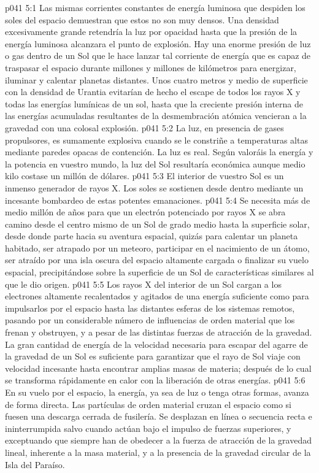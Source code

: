 \vs p041 5:1 Las mismas corrientes constantes de energía luminosa que despiden los soles del espacio demuestran que estos no son muy densos. Una densidad excesivamente grande retendría la luz por opacidad hasta que la presión de la energía luminosa alcanzara el punto de explosión. Hay una enorme presión de luz o gas dentro de un Sol que le hace lanzar tal corriente de energía que es capaz de traspasar el espacio durante millones y millones de kilómetros para energizar, iluminar y calentar planetas distantes. Unos cuatro metros y medio de superficie con la densidad de Urantia evitarían de hecho el escape de todos los rayos X y todas las energías lumínicas de un sol, hasta que la creciente presión interna de las energías acumuladas resultantes de la desmembración atómica vencieran a la gravedad con una colosal explosión.
\vs p041 5:2 La luz, en presencia de gases propulsores, es sumamente explosiva cuando se le constriñe a temperaturas altas mediante paredes opacas de contención. La luz es real. Según valoráis la energía y la potencia en vuestro mundo, la luz del Sol resultaría económica aunque medio kilo costase un millón de dólares.
\vs p041 5:3 El interior de vuestro Sol es un inmenso generador de rayos X. Los soles se sostienen desde dentro mediante un incesante bombardeo de estas potentes emanaciones.
\vs p041 5:4 Se necesita más de medio millón de años para que un electrón potenciado por rayos X se abra camino desde el centro mismo de un Sol de grado medio hasta la superficie solar, desde donde parte hacia su aventura espacial, quizás para calentar un planeta habitado, ser atrapado por un meteoro, participar en el nacimiento de un átomo, ser atraído por una isla oscura del espacio altamente cargada o finalizar su vuelo espacial, precipitándose sobre la superficie de un Sol de características similares al que le dio origen.
\vs p041 5:5 Los rayos X del interior de un Sol cargan a los electrones altamente recalentados y agitados de una energía suficiente como para impulsarlos por el espacio hasta las distantes esferas de los sistemas remotos, pasando por un considerable número de influencias de orden material que los frenan y obstruyen, y a pesar de las distintas fuerzas de atracción de la gravedad. La gran cantidad de energía de la velocidad necesaria para escapar del agarre de la gravedad de un Sol es suficiente para garantizar que el rayo de Sol viaje con velocidad incesante hasta encontrar amplias masas de materia; después de lo cual se transforma rápidamente en calor con la liberación de otras energías.
\vs p041 5:6 \pc En su vuelo por el espacio, la energía, ya sea de luz o tenga otras formas, avanza de forma directa. Las partículas de orden material cruzan el espacio como si fuesen una descarga cerrada de fusilería. Se desplazan en línea o secuencia recta e ininterrumpida salvo cuando actúan bajo el impulso de fuerzas superiores, y exceptuando que siempre han de obedecer a la fuerza de atracción de la gravedad lineal, inherente a la masa material, y a la presencia de la gravedad circular de la Isla del Paraíso.
